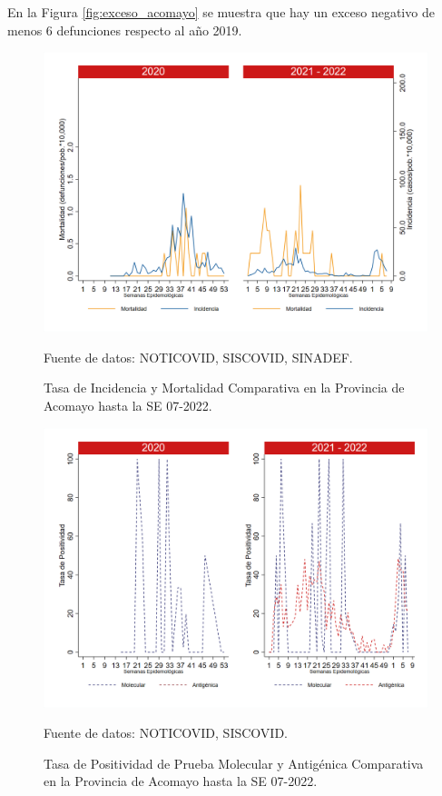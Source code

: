 \documentclass[12pt,a4paper,openany]{book}
\begin{document}
		 En la Figura \ref{fig:exceso_acomayo} se muestra que hay un exceso negativo de menos 6 defunciones respecto al año 2019.
		
		\begin{figure}[h]
			\caption{Tasa de Incidencia y Mortalidad Comparativa en la Provincia de Acomayo hasta la SE 07-2022.}\label{fig:inc_mort_acomayo}
			\begin{center}
				\includegraphics[width=0.65\linewidth]{../figuras/incidencia_mortalidad_20_21_1.png}
			\end{center}
			{\footnotesize {Fuente de datos: NOTICOVID, SISCOVID, SINADEF.}}
		\end{figure}
		
		\begin{figure}[h]
			\caption{Tasa de Positividad de Prueba Molecular y Antigénica Comparativa en la Provincia de Acomayo hasta la SE 07-2022. }\label{fig:positividad_acomayo}
			\begin{center}
				\includegraphics[width=0.7\linewidth]{../figuras/positividad_20_21_1.png}
			\end{center}
			{\footnotesize {Fuente de datos: NOTICOVID, SISCOVID.}}
		\end{figure}
		
\end{document}
